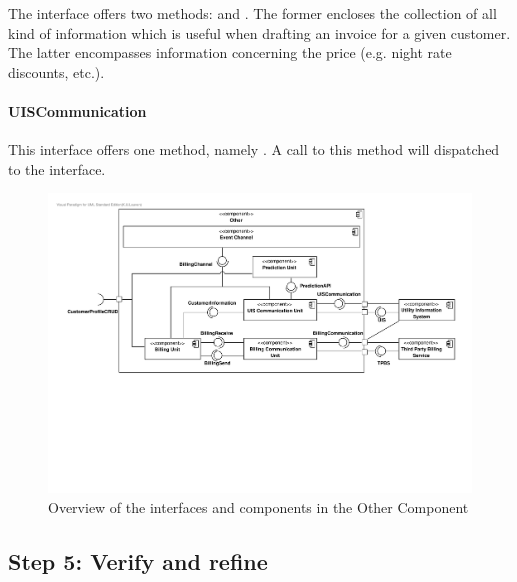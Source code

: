 \npar The  interface offers two methods:
 and
. The former encloses the collection of all
kind of information which is useful when drafting an invoice for a given
customer. The latter encompasses information concerning the price (e.g.
night rate discounts, etc.).

\paragraph{UISCommunication}
\npar This interface offers one method, namely
. A call to this
method will dispatched to the  interface.

\begin{figure}[H]
	\begin{centering}
		\includegraphics[width=\textwidth]{figs/add-it10-interfaces.pdf}
		\caption{Overview of the interfaces and components in the Other Component}
		\label{fig:it10/interfaces}
	\end{centering}
\end{figure}

\subsection{Step 5: Verify and refine}
\label{add:it10/verification}

